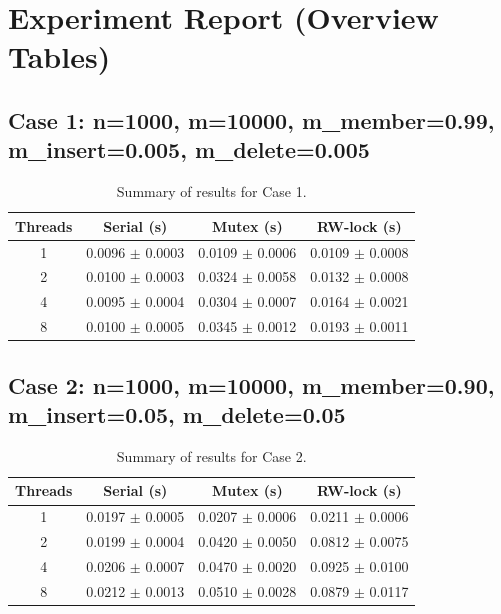 \documentclass{article}
\begin{document}
\section*{Experiment Report (Overview Tables)}
\subsection*{Case 1: n=1000, m=10000, m\_member=0.99, m\_insert=0.005, m\_delete=0.005}
\begin{table}[h!]
\centering
\begin{tabular}{cccc}
\toprule
\textbf{Threads} & \textbf{Serial (s)} & \textbf{Mutex (s)} & \textbf{RW-lock (s)} \\
\midrule
1 & 0.0096 $\pm$ 0.0003 & 0.0109 $\pm$ 0.0006 & 0.0109 $\pm$ 0.0008 \\
2 & 0.0100 $\pm$ 0.0003 & 0.0324 $\pm$ 0.0058 & 0.0132 $\pm$ 0.0008 \\
4 & 0.0095 $\pm$ 0.0004 & 0.0304 $\pm$ 0.0007 & 0.0164 $\pm$ 0.0021 \\
8 & 0.0100 $\pm$ 0.0005 & 0.0345 $\pm$ 0.0012 & 0.0193 $\pm$ 0.0011 \\
\bottomrule
\end{tabular}
\caption{Summary of results for Case 1.}
\label{tab:case1}
\end{table}
\subsection*{Case 2: n=1000, m=10000, m\_member=0.90, m\_insert=0.05, m\_delete=0.05}
\begin{table}[h!]
\centering
\begin{tabular}{cccc}
\toprule
\textbf{Threads} & \textbf{Serial (s)} & \textbf{Mutex (s)} & \textbf{RW-lock (s)} \\
\midrule
1 & 0.0197 $\pm$ 0.0005 & 0.0207 $\pm$ 0.0006 & 0.0211 $\pm$ 0.0006 \\
2 & 0.0199 $\pm$ 0.0004 & 0.0420 $\pm$ 0.0050 & 0.0812 $\pm$ 0.0075 \\
4 & 0.0206 $\pm$ 0.0007 & 0.0470 $\pm$ 0.0020 & 0.0925 $\pm$ 0.0100 \\
8 & 0.0212 $\pm$ 0.0013 & 0.0510 $\pm$ 0.0028 & 0.0879 $\pm$ 0.0117 \\
\bottomrule
\end{tabular}
\caption{Summary of results for Case 2.}
\label{tab:case2}
\end{table}
\end{document}
